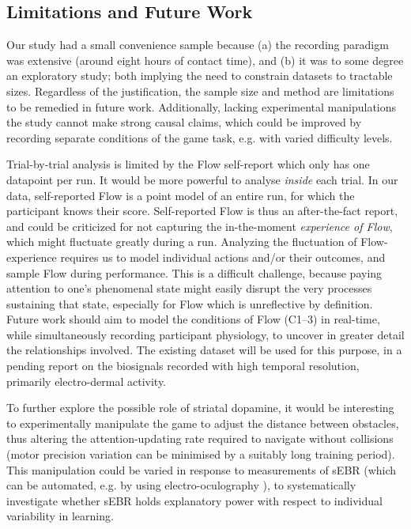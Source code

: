\documentclass[fleqn,10pt]{wlscirep}
\begin{document}
\subsection*{Limitations and Future Work}
Our study had a small convenience sample because (a) the recording paradigm was extensive (around eight hours of contact time), and (b) it was to some degree an exploratory study; both implying the need to constrain datasets to tractable sizes. Regardless of the justification, the sample size and method are limitations to be remedied in future work. Additionally, lacking experimental manipulations the study cannot make strong causal claims, which could be improved by recording separate conditions of the game task, e.g. with varied difficulty levels.

Trial-by-trial analysis is limited by the Flow self-report which only has one datapoint per run. It would be more powerful to analyse {\it inside} each trial. In our data, self-reported Flow is a point model of an entire run, for which the participant knows their score. Self-reported Flow is thus an after-the-fact report, and could be criticized for not capturing the in-the-moment {\it experience of Flow}, which might fluctuate greatly during a run. Analyzing the fluctuation of Flow-experience requires us to model individual actions and/or their outcomes, and sample Flow during performance. This is a difficult challenge, because paying attention to one's phenomenal state might easily disrupt the very processes sustaining that state, especially for Flow which is unreflective by definition. Future work should aim to model the conditions of Flow ({\sf C1--3}) in real-time, while simultaneously recording participant physiology, to uncover in greater detail the relationships involved. The existing dataset will be used for this purpose, in a pending report on the biosignals recorded with high temporal resolution, primarily electro-dermal activity.

To further explore the possible role of striatal dopamine, it would be interesting to experimentally manipulate the game to adjust the distance between obstacles, thus altering the attention-updating rate required to navigate without collisions (motor precision variation can be minimised by a suitably long training period). This manipulation could be varied in response to measurements of sEBR (which can be automated, e.g. by using electro-oculography \cite{toivanen2014}), to systematically investigate whether sEBR holds explanatory power with respect to individual variability in learning.
\end{document}
